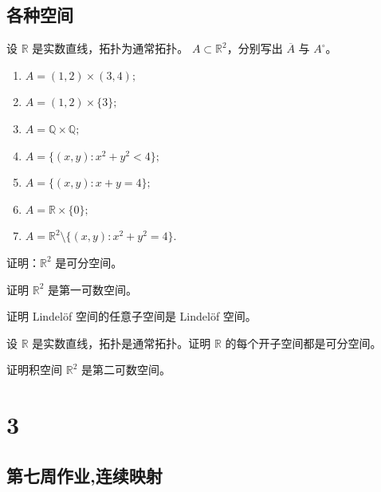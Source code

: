 \section{各种空间}

\begin{homework}[第 7 题]
设 $\mathbb{R}$ 是实数直线，拓扑为通常拓扑。  
$A \subset \mathbb{R}^2$，分别写出 $\overline{A}$ 与 $A^\circ$。

\begin{enumerate}[(1)]
  \item $A = (1,2) \times (3,4);$
  \item $A = (1,2) \times \{3\};$
  \item $A = \mathbb{Q} \times \mathbb{Q};$
  \item $A = \{(x,y): x^2 + y^2 < 4\};$
  \item $A = \{(x,y): x + y = 4\};$
  \item $A = \mathbb{R} \times \{0\};$
  \item $A = \mathbb{R}^2 \setminus \{(x,y): x^2 + y^2 = 4\}.$
\end{enumerate}
\end{homework}

\begin{homework}[第 8 题]
证明：$\mathbb{R}^2$ 是可分空间。
\end{homework}

\begin{homework}[第 9 题]
证明 $\mathbb{R}^2$ 是第一可数空间。
\end{homework}

\begin{homework}[10]
证明 Lindelöf 空间的任意子空间是 Lindelöf 空间。
\end{homework}

\begin{homework}[11]
设 $\mathbb{R}$ 是实数直线，拓扑是通常拓扑。证明 $\mathbb{R}$ 的每个开子空间都是可分空间。
\end{homework}

\begin{homework}[12]
证明积空间 $\mathbb{R}^2$ 是第二可数空间。
\end{homework}
\chapter{3}
\section{第七周作业,连续映射}

